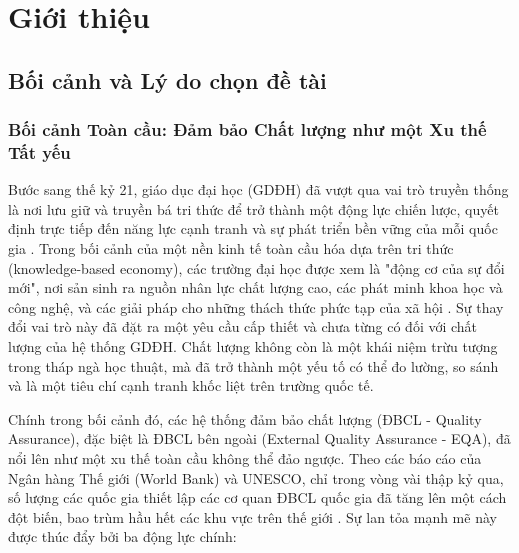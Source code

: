 \documentclass[12pt, a4paper, openany]{report}
\begin{document}
\chapter{Giới thiệu}
\label{chap:gioi_thieu}

\section{Bối cảnh và Lý do chọn đề tài}
\label{sec:boi_canh_ly_do}

\subsection{Bối cảnh Toàn cầu: Đảm bảo Chất lượng như một Xu thế Tất yếu}

Bước sang thế kỷ 21, giáo dục đại học (GDĐH) đã vượt qua vai trò truyền thống là nơi lưu giữ và truyền bá tri thức để trở thành một động lực chiến lược, quyết định trực tiếp đến năng lực cạnh tranh và sự phát triển bền vững của mỗi quốc gia \cite{Altbach2001, WB_KnowledgeEconomy}. Trong bối cảnh của một nền kinh tế toàn cầu hóa dựa trên tri thức (knowledge-based economy), các trường đại học được xem là "động cơ của sự đổi mới", nơi sản sinh ra nguồn nhân lực chất lượng cao, các phát minh khoa học và công nghệ, và các giải pháp cho những thách thức phức tạp của xã hội \cite{OECD_HE2008}. Sự thay đổi vai trò này đã đặt ra một yêu cầu cấp thiết và chưa từng có đối với chất lượng của hệ thống GDĐH. Chất lượng không còn là một khái niệm trừu tượng trong tháp ngà học thuật, mà đã trở thành một yếu tố có thể đo lường, so sánh và là một tiêu chí cạnh tranh khốc liệt trên trường quốc tế.

Chính trong bối cảnh đó, các hệ thống đảm bảo chất lượng (ĐBCL - Quality Assurance), đặc biệt là ĐBCL bên ngoài (External Quality Assurance - EQA), đã nổi lên như một xu thế toàn cầu không thể đảo ngược. Theo các báo cáo của Ngân hàng Thế giới (World Bank) và UNESCO, chỉ trong vòng vài thập kỷ qua, số lượng các quốc gia thiết lập các cơ quan ĐBCL quốc gia đã tăng lên một cách đột biến, bao trùm hầu hết các khu vực trên thế giới \cite{WorldBank_QA_GlobalTrends, UNESCO_QA2018}. Sự lan tỏa mạnh mẽ này được thúc đẩy bởi ba động lực chính:
\end{document}
